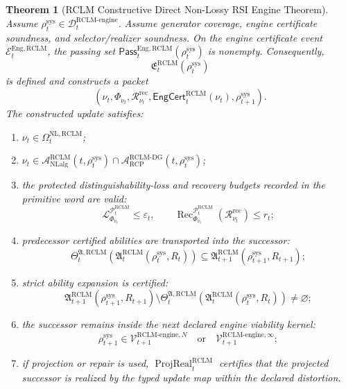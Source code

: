 \documentclass[11pt,a4paper]{article}
\newtheorem{theorem}{Theorem}[section]
\newcommand{\Lcal}{\mathcal L}
\newcommand{\Pcal}{\mathcal P}
\newcommand{\Acal}{\mathcal A}
\newcommand{\Vcal}{\mathcal V}
\newcommand{\Ecal}{\mathcal E}
\newcommand{\Dcal}{\mathcal D}
\newcommand{\eps}{\varepsilon}
\newcommand{\RCP}{\mathrm{RCP}}
\newcommand{\RCLM}{\mathrm{RCLM}}
\newcommand{\DG}{\mathrm{DG}}
\newcommand{\sys}{\mathrm{sys}}
\newcommand{\rec}{\mathrm{rec}}
\newcommand{\Rec}{\operatorname{Rec}}
\newcommand{\engine}{\mathrm{engine}}
\newcommand{\NL}{\mathrm{NL}}
\newcommand{\NLalg}{\mathrm{NLalg}}
\newcommand{\ProjReal}{\operatorname{ProjReal}}
\newcommand{\Eng}{\mathrm{Eng}}
\begin{document}
\begin{theorem}[RCLM Constructive Direct Non-Lossy RSI Engine Theorem]
\label{thm:rclm-constructive-direct-nl-rsi-engine}
Assume \(\rho_t^{\sys}\in\Dcal_t^{\RCLM\text{-}\engine}\). Assume generator coverage, engine certificate soundness, and selector/realizer soundness. On the engine certificate event \(\Ecal_t^{\Eng,\RCLM}\), the passing set \(\mathsf{Pass}_t^{\Eng,\RCLM}(\rho_t^{\sys})\) is nonempty. Consequently,
\[
\mathfrak E_t^{\RCLM}(\rho_t^{\sys})
\]
is defined and constructs a packet
\[
(\nu_t,
\Phi_{\nu_t},
\mathcal R_{\nu_t}^{\rec},
\mathsf{EngCert}_t^{\RCLM}(\nu_t),
\rho_{t+1}^{\sys}).
\]
The constructed update satisfies:
\begin{enumerate}[label=(\roman*),leftmargin=1.5em]
    \item \(\nu_t\in\Omega_t^{\NL,\RCLM}\);
    \item \(\nu_t\in\Acal_{\NLalg}^{\RCLM}(t,\rho_t^{\sys})\cap\Acal_{\RCP}^{\RCLM\text{-}\DG}(t,\rho_t^{\sys})\);
    \item the protected distinguishability-loss and recovery budgets recorded in the primitive word are valid:
    \[
    \Lcal_{\Phi_{\nu_t}}^{\Pcal_t^{\RCLM}}\le\eps_t,
    \qquad
    \Rec_{\Phi_{\nu_t}}^{\Pcal_t^{\RCLM}}(\mathcal R_{\nu_t}^{\rec})\le r_t;
    \]
    \item predecessor certified abilities are transported into the successor:
    \[
    \Theta_t^{\mathfrak A,\RCLM}(\mathfrak A_t^{\RCLM}(\rho_t^{\sys},R_t))
    \subseteq
    \mathfrak A_{t+1}^{\RCLM}(\rho_{t+1}^{\sys},R_{t+1});
    \]
    \item strict ability expansion is certified:
    \[
    \mathfrak A_{t+1}^{\RCLM}(\rho_{t+1}^{\sys},R_{t+1})
    \setminus
    \Theta_t^{\mathfrak A,\RCLM}(\mathfrak A_t^{\RCLM}(\rho_t^{\sys},R_t))
    \neq\varnothing;
    \]
    \item the successor remains inside the next declared engine viability kernel:
    \[
    \rho_{t+1}^{\sys}\in
    \Vcal_{t+1}^{\RCLM\text{-}\engine,N}
    \quad\text{or}\quad
    \Vcal_{t+1}^{\RCLM\text{-}\engine,\infty};
    \]
    \item if projection or repair is used, \(\ProjReal_t^{\RCLM}\) certifies that the projected successor is realized by the typed update map within the declared distortion.
\end{enumerate}
\end{theorem}
\end{document}
